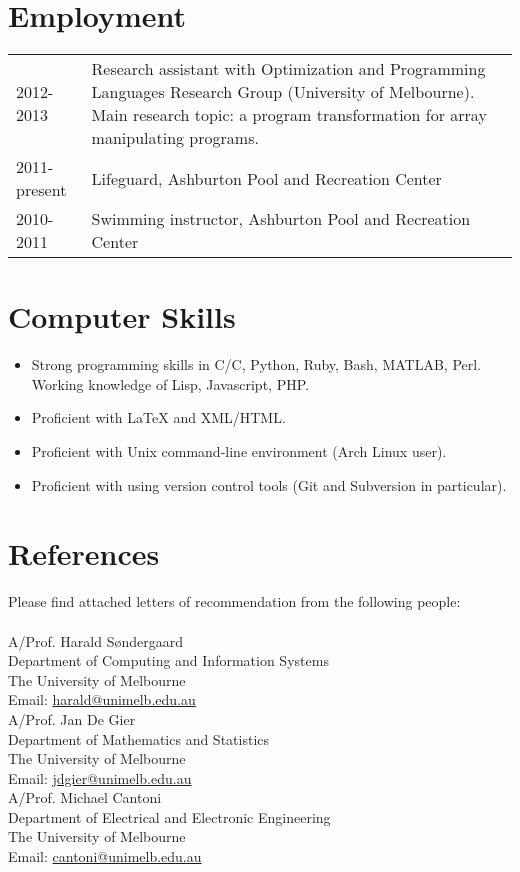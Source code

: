 \documentclass[12pt,a4paper]{article}
\newcommand{\mailto}[1]{\href{mailto:#1}{\url{#1}} }
\newcommand{\CPP}
{C\nolinebreak[4]\hspace{-.05em}\raisebox{.22ex}{\footnotesize\bf ++ }}
\newenvironment{llist}
	{\renewcommand{\arraystretch}{1.5}\begin{tabular}{p{3cm} p{12cm}}}
	{\end{tabular}}
\begin{document}
\section*{Employment}
\begin{llist}
  2012-2013 & Research assistant with Optimization and Programming Languages
  Research Group (University of Melbourne). Main research topic: a program
  transformation for array manipulating programs. \\
	2011-present & Lifeguard, Ashburton Pool and Recreation Center \\
	2010-2011 & Swimming instructor, Ashburton Pool and Recreation Center \\
\end{llist}

\section*{Computer Skills}
\begin{itemize}
  \item Strong programming skills in C/\CPP, Python, Ruby, Bash, MATLAB,
    Perl. Working knowledge of Lisp, Javascript, PHP. 
	\item Proficient with {\LaTeX} and XML/HTML.
  \item Proficient with Unix command-line environment (Arch Linux user).
  \item Proficient with using version control tools (Git and Subversion in
    particular).
\end{itemize}

\pagebreak
\section*{References}
Please find attached letters of recommendation from the following people: \\ \\

\noindent
A/Prof. Harald S\o ndergaard  \\
Department of Computing and Information Systems \\
The University of Melbourne \\
Email: \mailto{harald@unimelb.edu.au} \\

\noindent
A/Prof. Jan De Gier \\
Department of Mathematics and Statistics\\
The University of Melbourne \\
Email: \mailto{jdgier@unimelb.edu.au} \\

\noindent
A/Prof. Michael Cantoni \\
Department of Electrical and Electronic Engineering \\
The University of Melbourne \\
Email: \mailto{cantoni@unimelb.edu.au}

\hfill \qedsymbol
\end{document}
